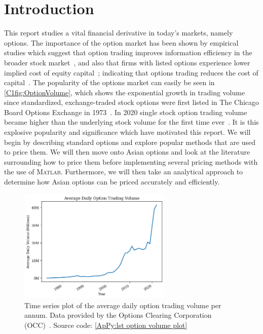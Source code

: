 \chapter{Introduction}
This report studies a vital financial derivative in today's markets, namely options. The importance of the option market has been shown by empirical studies which suggest that option trading improves information efficiency in the broader stock market~\cite{PanInfoEffic,li2021effect}, and also that firms with listed options experience lower implied cost of equity capital~\cite{naikerLowEquity}; indicating that options trading reduces the cost of capital~\cite{li2021effect}. The popularity of the options market can easily be seen in \autoref{C1fig:OptionVolume}, which shows the exponential growth in trading volume since standardized, exchange-traded stock options were first listed in The Chicago Board Options Exchange in 1973~\cite{markham2002financial}. In 2020 single stock option trading volume became higher than the underlying stock volume for the first time ever~\cite{yahooOptions}. 
\nline{}
It is this explosive popularity and significance which have motivated this report. We will begin by describing standard options and explore popular methods that are used to price them. We will then move onto Asian options and look at the literature surrounding how to price them before implementing several pricing methods with the use of \textsc{Matlab}. Furthermore, we will then take an analytical approach to determine how Asian options can be priced accurately and efficiently.

\begin{figure}[H]
    \centering
    \includegraphics[width=0.65\textwidth]{Chapters/C1/plots/OptionVolume.png}
    \caption{Time series plot of the average daily option trading volume per annum. Data provided by the Options Clearing Corporation (OCC)~\cite{THEOCC}. Source code: \autoref{ApPy:lst option volume plot}}\label{C1fig:OptionVolume}
\end{figure}

